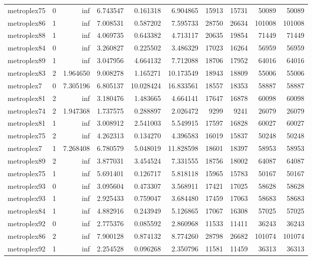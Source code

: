\begin{longtable}{|l|r|r|r|r|r|r|r|r|r|}
metroplex75 & 0 & inf & 6.743547 & 0.161318 & 6.904865 & 15913 & 15731 & 50089 & 50089 \\
metroplex86 & 1 & inf & 7.008531 & 0.587202 & 7.595733 & 28750 & 26634 & 101008 & 101008 \\
metroplex88 & 1 & inf & 4.069735 & 0.643382 & 4.713117 & 20635 & 19854 & 71449 & 71449 \\
metroplex84 & 0 & inf & 3.260827 & 0.225502 & 3.486329 & 17023 & 16264 & 56959 & 56959 \\
metroplex89 & 1 & inf & 3.047956 & 4.664132 & 7.712088 & 18706 & 17952 & 64016 & 64016 \\
metroplex83 & 2 & 1.964650 & 9.008278 & 1.165271 & 10.173549 & 18943 & 18809 & 55006 & 55006 \\
metroplex7 & 0 & 7.305196 & 6.805137 & 10.028424 & 16.833561 & 18557 & 18353 & 58887 & 58887 \\
metroplex81 & 2 & inf & 3.180476 & 1.483665 & 4.664141 & 17647 & 16878 & 60098 & 60098 \\
metroplex74 & 2 & 1.947368 & 1.737575 & 0.288897 & 2.026472 & 9299 & 9241 & 26079 & 26079 \\
metroplex81 & 1 & inf & 3.008912 & 2.541003 & 5.549915 & 17597 & 16828 & 60027 & 60027 \\
metroplex75 & 2 & inf & 4.262313 & 0.134270 & 4.396583 & 16019 & 15837 & 50248 & 50248 \\
metroplex7 & 1 & 7.268408 & 6.780579 & 5.048019 & 11.828598 & 18601 & 18397 & 58953 & 58953 \\
metroplex89 & 2 & inf & 3.877031 & 3.454524 & 7.331555 & 18756 & 18002 & 64087 & 64087 \\
metroplex75 & 1 & inf & 5.691401 & 0.126717 & 5.818118 & 15965 & 15783 & 50167 & 50167 \\
metroplex93 & 0 & inf & 3.095604 & 0.473307 & 3.568911 & 17421 & 17025 & 58628 & 58628 \\
metroplex93 & 1 & inf & 2.925433 & 0.759047 & 3.684480 & 17459 & 17063 & 58683 & 58683 \\
metroplex84 & 1 & inf & 4.882916 & 0.243949 & 5.126865 & 17067 & 16308 & 57025 & 57025 \\
metroplex92 & 0 & inf & 2.775376 & 0.085592 & 2.860968 & 11533 & 11411 & 36243 & 36243 \\
metroplex86 & 2 & inf & 7.900128 & 0.874132 & 8.774260 & 28798 & 26682 & 101074 & 101074 \\
metroplex92 & 1 & inf & 2.254528 & 0.096268 & 2.350796 & 11581 & 11459 & 36313 & 36313 \\

\end{longtable}
